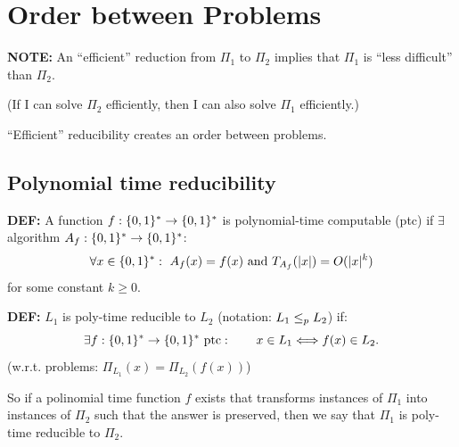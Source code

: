 \section{Order between Problems}
\textbf{NOTE:} An ``efficient'' reduction from $\Pi_1$ to $\Pi_2$ implies that $\Pi_1$ is ``less difficult'' than $\Pi_2$.

(If I can solve $\Pi_2$ efficiently, then I can also solve $\Pi_1$ efficiently.)

``Efficient'' reducibility creates an order between problems.

\subsection{Polynomial time reducibility}

\begin{notesdefinition}
\textbf{DEF:} A function $f:\{0,1\}^*\to\{0,1\}^*$ is polynomial-time computable (ptc) if $\exists$ algorithm $A_f:\{0,1\}^*\to\{0,1\}^*$:
\[
\forall x\in\{0,1\}^*:\ A_f(x)=f(x)\text{ and }T_{A_f}(|x|)=O(|x|^k)
\]
for some constant $k\geq0$.
\end{notesdefinition}

\begin{notesdefinition}
\textbf{DEF:} $L_1$ is poly-time reducible to $L_2$ (notation: $L_1\leq_p L_2$) if:
\[
\exists f:\{0,1\}^*\to\{0,1\}^*\text{ ptc}:\qquad x\in L_1\Longleftrightarrow f(x)\in L_2.
\]
(w.r.t. problems: $\Pi_{L_1}(x)=\Pi_{L_2}(f(x))$)
\end{notesdefinition}

So if a polinomial time function $f$ exists that transforms instances of $\Pi_1$ into instances of $\Pi_2$ such that the answer is preserved, then we say that $\Pi_1$ is poly-time reducible to $\Pi_2$.

